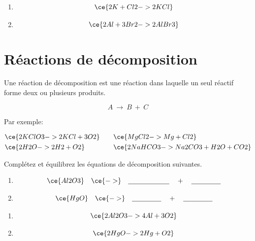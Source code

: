 \documentclass[
  11pt,
  a4paper,
  openany]{book}
\begin{document}
\begin{Answer}

\begin{enumerate}
\def\labelenumi{\arabic{enumi}.}
\item
  \[\ce{2K + Cl2 -> 2KCl }\]
\item
  \[\ce{2 Al + 3 Br2 -> 2 AlBr3 }\]
\end{enumerate}

\end{Answer}

\section{Réactions de décomposition}\label{ruxe9actions-de-duxe9composition}

Une réaction de décomposition est une réaction dans laquelle un seul réactif forme deux ou plusieurs produits.

\[ A\ \longrightarrow\ B\ +\ C \]

Par exemple:

\[ \begin{split}
  & \ce{2KClO3 -> 2KCl + 3O2} \\
  & \ce{2H2O -> 2H2 + O2}
  \end{split}
  \qquad
  \begin{split}
  & \ce{MgCl2 -> Mg + Cl2} \\
  & \ce{2NaHCO3 -> Na2CO3 + H2O + CO2}
  \end{split} \]

\begin{Exercise}

Complétez et équilibrez les équations de décomposition suivantes.

\begin{enumerate}
\def\labelenumi{\arabic{enumi}.}
\item
  \[\ce{Al2O3} \quad \ce{->} \quad \underline{\hspace{6em}} \quad + \quad \underline{\hspace{1.5cm}}\]
\item
  \[\ce{HgO} \quad \ce{->} \quad \underline{\hspace{1.5cm}} \quad + \quad \underline{\hspace{1.5cm}}\]
\end{enumerate}

\end{Exercise}

\begin{Answer}

\begin{enumerate}
\def\labelenumi{\arabic{enumi}.}
\item
  \[\ce{2 Al2O3 -> 4 Al + 3 O2}\]
\item
  \[\ce{2 HgO -> 2 Hg + O2}\]
\end{enumerate}

\end{Answer}
\end{document}
